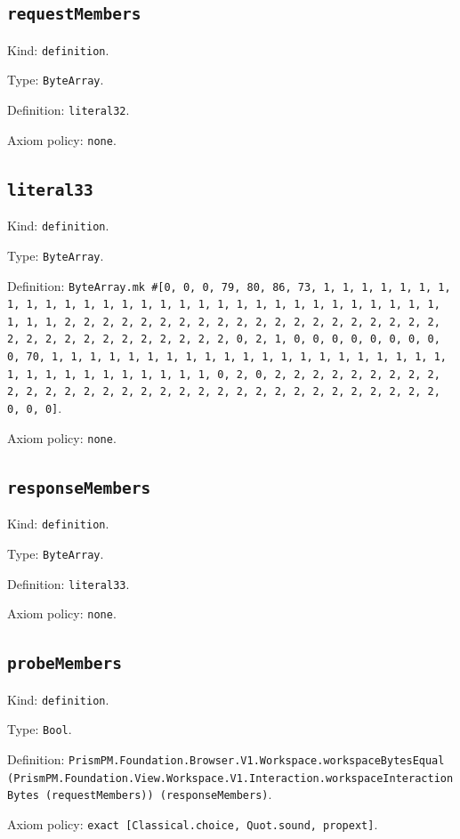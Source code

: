 \documentclass[11pt]{article}
\begin{document}
\subsection*{\texttt{requestMembers}}
\noindent Kind: \texttt{definition}.\par
\noindent Type: \texttt{ByteArray}.\par
\noindent Definition: \texttt{literal32}.\par
\noindent Axiom policy: \texttt{none}.\par
\subsection*{\texttt{literal33}}
\noindent Kind: \texttt{definition}.\par
\noindent Type: \texttt{ByteArray}.\par
\noindent Definition: \texttt{ByteArray.mk \#[0, 0, 0, 79, 80, 86, 73, 1, 1, 1, 1, 1, 1, 1, 1, 1, 1, 1, 1, 1, 1, 1, 1, 1, 1, 1, 1, 1, 1, 1, 1, 1, 1, 1, 1, 1, 1, 1, 1, 1, 2, 2, 2, 2, 2, 2, 2, 2, 2, 2, 2, 2, 2, 2, 2, 2, 2, 2, 2, 2, 2, 2, 2, 2, 2, 2, 2, 2, 2, 2, 2, 2, 0, 2, 1, 0, 0, 0, 0, 0, 0, 0, 0, 0, 70, 1, 1, 1, 1, 1, 1, 1, 1, 1, 1, 1, 1, 1, 1, 1, 1, 1, 1, 1, 1, 1, 1, 1, 1, 1, 1, 1, 1, 1, 1, 1, 1, 0, 2, 0, 2, 2, 2, 2, 2, 2, 2, 2, 2, 2, 2, 2, 2, 2, 2, 2, 2, 2, 2, 2, 2, 2, 2, 2, 2, 2, 2, 2, 2, 2, 2, 2, 0, 0, 0]}.\par
\noindent Axiom policy: \texttt{none}.\par
\subsection*{\texttt{responseMembers}}
\noindent Kind: \texttt{definition}.\par
\noindent Type: \texttt{ByteArray}.\par
\noindent Definition: \texttt{literal33}.\par
\noindent Axiom policy: \texttt{none}.\par
\subsection*{\texttt{probeMembers}}
\noindent Kind: \texttt{definition}.\par
\noindent Type: \texttt{Bool}.\par
\noindent Definition: \texttt{PrismPM.Foundation.Browser.V1.Workspace.workspaceBytesEqual (PrismPM.Foundation.View.Workspace.V1.Interaction.workspaceInteractionBytes (requestMembers)) (responseMembers)}.\par
\noindent Axiom policy: \texttt{exact [Classical.choice, Quot.sound, propext]}.\par
\end{document}

